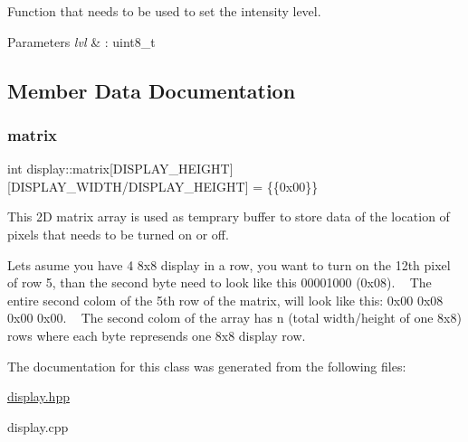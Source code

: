 Function that needs to be used to set the intensity level. 


\begin{DoxyParams}{Parameters}
{\em lvl} & \+: uint8\+\_\+t \\
\hline
\end{DoxyParams}


\subsection{Member Data Documentation}
\mbox{\label{classdisplay_a7577a542a26a85ebf47e012d8b45070b}} 
\subsubsection{\texorpdfstring{matrix}{matrix}}
{\footnotesize\ttfamily int display\+::matrix\mbox{[}D\+I\+S\+P\+L\+A\+Y\+\_\+\+H\+E\+I\+G\+HT\mbox{]}\mbox{[}D\+I\+S\+P\+L\+A\+Y\+\_\+\+W\+I\+D\+TH/D\+I\+S\+P\+L\+A\+Y\+\_\+\+H\+E\+I\+G\+HT\mbox{]} = \{\{0x00\}\}}



This 2D matrix array is used as temprary buffer to store data of the location of pixels that needs to be turned on or off. 

Lets asume you have 4 8x8 display in a row, you want to turn on the 12th pixel of row 5, than the second byte need to look like this 00001000 (0x08). ~\newline
The entire second colom of the 5th row of the matrix, will look like this\+: 0x00 0x08 0x00 0x00. ~\newline
The second colom of the array has n (total width/height of one 8x8) rows where each byte represends one 8x8 display row. 

The documentation for this class was generated from the following files\+:\begin{DoxyCompactItemize}
\item 
\hyperlink{display_8hpp}{display.\+hpp}\item 
display.\+cpp\end{DoxyCompactItemize}
